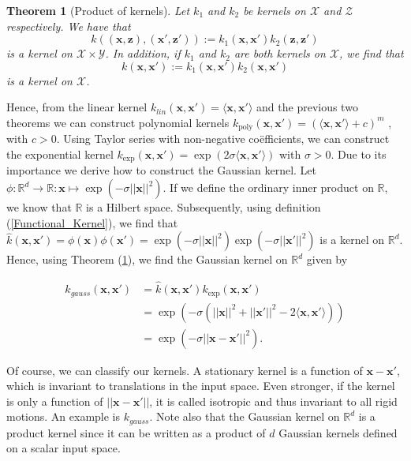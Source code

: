 \documentclass[12pt,a4paper,oneside]{book}
\newtheorem{Theorem}{Theorem}
\begin{document}
\begin{Theorem}[Product of kernels]\label{Functional_Product}
Let $k_1$ and $k_2$ be kernels on $\mathcal{X}$ and $\mathcal{Z}$ respectively. We have that 
\begin{equation}\label{Functional_Product_first_eq}
k((\bm{x},\bm{z}),(\bm{x}',\bm{z}')) := k_1(\bm{x},\bm{x}')k_2(\bm{z},\bm{z}')
\end{equation}
is a kernel on $\mathcal{X} \times \mathcal{Y}$. In addition, if $k_1$ and $k_2$ are both kernels on $\mathcal{X}$, we find that 
\begin{equation}
k(\bm{x},\bm{x}') := k_1(\bm{x},\bm{x}')k_2(\bm{x},\bm{x}')
\end{equation}
is a kernel on $\mathcal{X}$.
\end{Theorem}

Hence, from the linear kernel $k_{lin} (\bm{x},\bm{x}') = \langle \bm{x},\bm{x}' \rangle$ and the previous two theorems we can construct polynomial kernels $ k_{\text{poly}}(\bm{x},\bm{x}') = (\langle \bm{x},\bm{x}' \rangle + c)^{m}$ , with $c>0$. Using Taylor series with non-negative co\"{e}fficients, we can construct the exponential kernel $ k_{\exp}(\bm{x},\bm{x}') = \exp(2\sigma \langle \bm{x},\bm{x}' \rangle)$ with $\sigma >0$. Due to its importance we derive how to construct the Gaussian kernel. Let $\phi : \mathbb{R}^d \rightarrow \mathbb{R} : \bm{x} \mapsto \exp(-\sigma ||\bm{x}||^2)$. If we define the ordinary inner product on $\mathbb{R}$, we know that $\mathbb{R}$ is a Hilbert space. Subsequently, using definition (\ref{Functional_Kernel}), we find that $\hat{k}(\bm{x},\bm{x}') = \phi(\bm{x}) \phi(\bm{x}') = \exp(-\sigma ||\bm{x}||^2) \exp(-\sigma ||\bm{x}'||^2)$ is a kernel on $\mathbb{R}^d$. Hence, using Theorem (\ref{Functional_Product}), we find the Gaussian kernel on $\mathbb{R}^d$ given by 

\begin{align}
k_{gauss}(\bm{x},\bm{x}') &= \hat{k}(\bm{x},\bm{x}') k_{\exp} (\bm{x},\bm{x}') \nonumber \\
 &= \exp{(-\sigma(||\bm{x}||^2 + ||\bm{x}'||^2 - 2 \langle \bm{x},\bm{x}' \rangle ))}  \nonumber \\
&= \exp{(-\sigma ||\bm{x}-\bm{x}'||^2)}.
\end{align}

Of course, we can classify our kernels. A stationary kernel is a function of $\bm{x} - \bm{x}'$, which is invariant to translations in the input space. Even stronger, if the kernel is only a function of $||\bm{x} - \bm{x}'||$, it is called isotropic and thus invariant to all rigid motions. An example is $k_{gauss}$. Note also that the Gaussian kernel on $\mathbb{R}^d$ is a product kernel since it can be written as a product of $d$ Gaussian kernels defined on a scalar input space.
\end{document}
